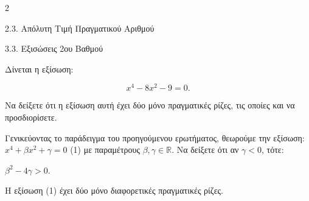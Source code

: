 \begin{ylh}{2}
    \item 2.3. Απόλυτη Τιμή Πραγματικού Αριθμού
    \item 3.3. Εξισώσεις 2ου Βαθμού
\end{ylh}

\begin{alist}
\item Δίνεται η εξίσωση:

\begin{equation*}x^{4} - 8x^{2} - 9 = 0.\end{equation*}

Να δείξετε ότι η εξίσωση αυτή έχει δύο μόνο πραγματικές ρίζες, τις οποίες και να προσδιορίσετε.
\item Γενικεύοντας το παράδειγμα του προηγούμενου ερωτήματος, θεωρούμε την εξίσωση:
$x^{4} + \beta x^{2} + \gamma = 0$ (1) με παραμέτρους $\beta,\gamma \in \mathbb{R}$. Να δείξετε ότι αν $\gamma < 0$, τότε:
\begin{rlist}
\item
  $\beta^{2} - 4\gamma > 0$.
\item
  Η εξίσωση (1) έχει δύο μόνο διαφορετικές πραγματικές ρίζες.
\end{rlist}
\end{alist}

